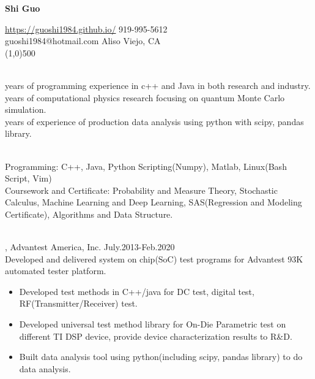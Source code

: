 \documentclass[11pt]{article} %
\begin{document}
 \centerline{\Large \bf Shi Guo}
  \noindent \url{https://guoshi1984.github.io/} \hspace{80mm}  919-995-5612\\
    guoshi1984@hotmail.com \hspace{95mm}   Aliso Viejo, CA\\
\line(1,0){500}


\vspace{1mm}

\\
 years of programming experience in c++ and Java in both research and industry.  \\
 years of computational physics research focusing on quantum Monte Carlo simulation.\\
 years of experience of production data analysis using python with scipy, pandas library.  \\

\vspace{1mm}

\\
\noindent 
Programming: C++, Java, Python Scripting(Numpy), Matlab,  Linux(Bash Script, Vim) \\
Coursework and Certificate: Probability and Measure Theory, Stochastic Calculus,
 Machine Learning and Deep Learning, SAS(Regression and Modeling Certificate), Algorithms and Data Structure.  



\vspace{2mm}

\\
, Advantest America, Inc. July.2013-Feb.2020\\
\noindent Developed and delivered system on chip(SoC) test programs for Advantest 93K automated tester platform.\\ 
\begin{itemize}
  
    \item Developed test methods in C++/java for DC test, digital test, RF(Transmitter/Receiver) test.\\
 \vspace{-4mm}
    \item  Developed universal test method library for On-Die Parametric test on different TI DSP device, provide device characterization results to R\&D.\\ 
 
  \vspace{-4mm}
 \item  Built data analysis tool using python(including scipy, pandas library) to do data analysis.

  
 \end{itemize}
\end{document}
